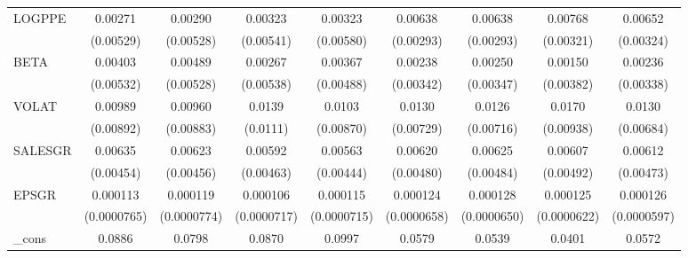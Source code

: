 \begin{table}[htbp]
\begin{tabular}{l*{8}{c}}
LOGPPE              &     0.00271         &     0.00290         &     0.00323         &     0.00323         &     0.00638\sym{**} &     0.00638\sym{*}  &     0.00768\sym{**} &     0.00652\sym{*}  \\
                    &   (0.00529)         &   (0.00528)         &   (0.00541)         &   (0.00580)         &   (0.00293)         &   (0.00293)         &   (0.00321)         &   (0.00324)         \\
BETA                &     0.00403         &     0.00489         &     0.00267         &     0.00367         &     0.00238         &     0.00250         &     0.00150         &     0.00236         \\
                    &   (0.00532)         &   (0.00528)         &   (0.00538)         &   (0.00488)         &   (0.00342)         &   (0.00347)         &   (0.00382)         &   (0.00338)         \\
VOLAT               &     0.00989         &     0.00960         &      0.0139         &      0.0103         &      0.0130\sym{*}  &      0.0126         &      0.0170\sym{*}  &      0.0130\sym{*}  \\
                    &   (0.00892)         &   (0.00883)         &    (0.0111)         &   (0.00870)         &   (0.00729)         &   (0.00716)         &   (0.00938)         &   (0.00684)         \\
SALESGR             &     0.00635         &     0.00623         &     0.00592         &     0.00563         &     0.00620         &     0.00625         &     0.00607         &     0.00612         \\
                    &   (0.00454)         &   (0.00456)         &   (0.00463)         &   (0.00444)         &   (0.00480)         &   (0.00484)         &   (0.00492)         &   (0.00473)         \\
EPSGR               &    0.000113         &    0.000119         &    0.000106         &    0.000115         &    0.000124\sym{*}  &    0.000128\sym{*}  &    0.000125\sym{*}  &    0.000126\sym{*}  \\
                    & (0.0000765)         & (0.0000774)         & (0.0000717)         & (0.0000715)         & (0.0000658)         & (0.0000650)         & (0.0000622)         & (0.0000597)         \\
\_cons              &      0.0886         &      0.0798         &      0.0870         &      0.0997\sym{*}  &      0.0579         &      0.0539         &      0.0401         &      0.0572         \\

\end{tabular}
\end{table}
